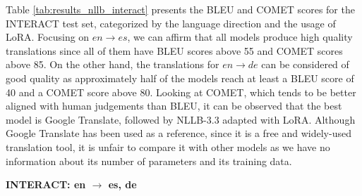 \documentclass[11pt,english,listoffigures,listoftables]{tfgetsinf}
\begin{document}
Table \ref{tab:results_nllb_interact} presents the BLEU and COMET scores for the INTERACT test set, categorized by the language direction and the usage of LoRA. Focusing on $en \rightarrow es$, we can affirm that all models produce high quality translations since all of them have BLEU scores above 55 and COMET scores above 85. On the other hand, the translations for $en \rightarrow de$ can be considered of good quality as approximately half of the models reach at least a BLEU score of 40 and a COMET score above 80. Looking at COMET, which tends to be better aligned with human judgements than BLEU, it can be observed that the best model is Google Translate, followed by NLLB-3.3 adapted with LoRA. Although Google Translate has been used as a reference, since it is a free and widely-used translation tool, it is unfair to compare it with other models as we have no information about its number of parameters and its training data.

\begin{table}[h]
    \centering
    \caption{BLEU and COMET scores for encoder-decoder models on INTERACT test set}
    \label{tab:results_nllb_interact}
    \textbf{INTERACT: en $\rightarrow$ es, de \\}
\end{table}
\end{document}

